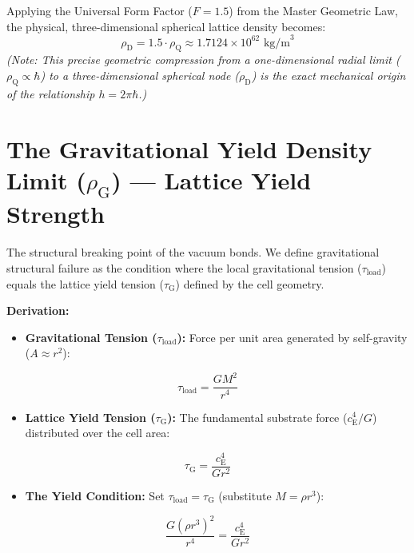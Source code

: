 Applying the Universal Form Factor ($F=1.5$) from the Master Geometric Law, the physical, three-dimensional spherical lattice density becomes:
\begin{equation}
    \rho_{\mathrm{D}} = 1.5 \cdot \rho_{\mathrm{Q}} \approx 1.7124 \times 10^{62} \text{ kg/m}^3
\end{equation}
\textit{(Note: This precise geometric compression from a one-dimensional radial limit ($\rho_{\mathrm{Q}} \propto \hbar$) to a three-dimensional spherical node ($\rho_{\mathrm{D}}$) is the exact mechanical origin of the relationship $h = 2\pi\hbar$.)}

\section{The Gravitational Yield Density Limit ($\rho_{\mathrm{G}}$) --- Lattice Yield Strength}
The structural breaking point of the vacuum bonds. We define gravitational structural failure as the condition where the local gravitational tension ($\tau_{\mathrm{load}}$) equals the lattice yield tension ($\tau_{\mathrm{G}}$) defined by the cell geometry.

\noindent\textbf{Derivation:}
\begin{itemize}
    \item \textbf{Gravitational Tension ($\tau_{\mathrm{load}}$):} Force per unit area generated by self-gravity ($A \approx r^2$):
\end{itemize}
\begin{equation}
    \tau_{\mathrm{load}} = \frac{G M^2}{r^4}
\end{equation}

\begin{itemize}
    \item \textbf{Lattice Yield Tension ($\tau_{\mathrm{G}}$):} The fundamental substrate force ($c_{\mathrm{E}}^4/G$) distributed over the cell area:
\end{itemize}
\begin{equation}
    \tau_{\mathrm{G}} = \frac{c_{\mathrm{E}}^4}{G r^2}
\end{equation}

\begin{itemize}
    \item \textbf{The Yield Condition:} Set $\tau_{\mathrm{load}} = \tau_{\mathrm{G}}$ (substitute $M = \rho r^3$):
\end{itemize}
\begin{equation}
    \frac{G(\rho r^3)^2}{r^4} = \frac{c_{\mathrm{E}}^4}{G r^2}
\end{equation}


